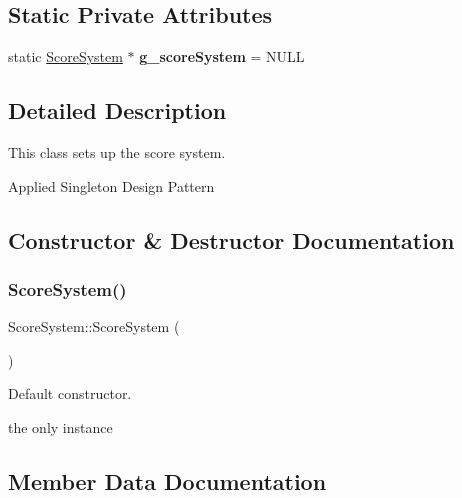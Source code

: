 \subsection*{Static Private Attributes}
\begin{DoxyCompactItemize}
\item 
\mbox{\label{class_score_system_a89ac65f416b67a3cc995e6dc767bb214}} 
static \mbox{\hyperlink{class_score_system}{Score\+System}} $\ast$ {\bfseries g\+\_\+score\+System} = N\+U\+LL
\end{DoxyCompactItemize}


\subsection{Detailed Description}
This class sets up the score system. 

Applied Singleton Design Pattern 

\subsection{Constructor \& Destructor Documentation}
\mbox{\label{class_score_system_a00f42e35ee447789aaac42b213143297}} 
\subsubsection{\texorpdfstring{Score\+System()}{ScoreSystem()}}
{\footnotesize\ttfamily Score\+System\+::\+Score\+System (\begin{DoxyParamCaption}{ }\end{DoxyParamCaption})\hspace{0.3cm}{\ttfamily [private]}}



Default constructor. 

the only instance 

\subsection{Member Data Documentation}
\mbox{\label{class_score_system_a0d24909986b86503fa9cc48550eaeb5e}} 
